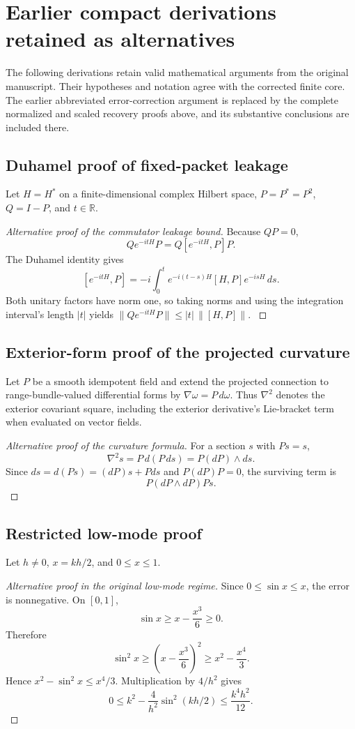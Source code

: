 
\section{Earlier compact derivations retained as alternatives}\label{legacy:section:001}\label{legacy:alternatives}
The following derivations retain valid mathematical arguments from the original manuscript. Their hypotheses and notation agree with the corrected finite core. The earlier abbreviated error-correction argument is replaced by the complete normalized and scaled recovery proofs above, and its substantive conclusions are included there.
\subsection{Duhamel proof of fixed-packet leakage}\label{legacy:duhamel}
Let $H=H^*$ on a finite-dimensional complex Hilbert space, $P=P^*=P^2$, $Q=I-P$, and $t\in\mathbb R$.
\begin{proof}[Alternative proof of the commutator leakage bound]\label{legacy:proof:001}
Because $QP=0$,
\[
Qe^{-itH}P=Q[e^{-itH},P]P.
\]
The Duhamel identity gives
\[
[e^{-itH},P]=-i\int_0^t e^{-i(t-s)H}[H,P]e^{-isH}\,ds.
\]
Both unitary factors have norm one, so taking norms and using the integration interval's length $|t|$ yields
$\|Qe^{-itH}P\|\le |t|\,\|[H,P]\|$.
\label{legacy:proof:001:end}\end{proof}
\subsection{Exterior-form proof of the projected curvature}\label{legacy:exterior}
Let $P$ be a smooth idempotent field and extend the projected connection to range-bundle-valued differential forms by $\nabla\omega=P\,d\omega$. Thus $\nabla^2$ denotes the exterior covariant square, including the exterior derivative's Lie-bracket term when evaluated on vector fields.
\begin{proof}[Alternative proof of the curvature formula]\label{legacy:proof:002}
For a section $s$ with $Ps=s$,
\[
\nabla^2s=P\,d(P\,ds)=P(dP)\wedge ds.
\]
Since $ds=d(Ps)=(dP)s+Pds$ and $P(dP)P=0$, the surviving term is
\[
P(dP\wedge dP)Ps.
\]
\label{legacy:proof:002:end}\end{proof}
\subsection{Restricted low-mode proof}\label{legacy:lowmode}
Let $h\ne0$, $x=kh/2$, and $0\le x\le1$.
\begin{proof}[Alternative proof in the original low-mode regime]\label{legacy:proof:003}
Since $0\le\sin x\le x$, the error is nonnegative. On $[0,1]$,
\[
\sin x\ge x-\frac{x^3}{6}\ge0.
\]
Therefore
\[
\sin^2x\ge\left(x-\frac{x^3}{6}\right)^2\ge x^2-\frac{x^4}{3}.
\]
Hence $x^2-\sin^2x\le x^4/3$. Multiplication by $4/h^2$ gives
\[
0\le k^2-\frac4{h^2}\sin^2(kh/2)\le\frac{k^4h^2}{12}.
\]
\label{legacy:proof:003:end}\end{proof}
